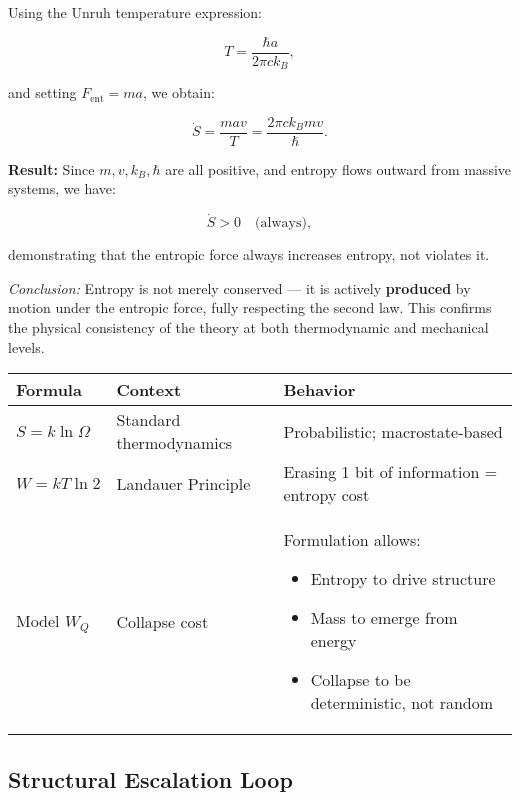 \documentclass[12pt]{article}
\begin{document}
Using the Unruh temperature expression:

\[
T = \frac{\hbar a}{2\pi c k_B},
\]

and setting \( F_{\text{ent}} = m a \), we obtain:

\[
\dot{S} = \frac{m a v}{T} = \frac{2\pi c k_B m v}{\hbar}.
\]

\textbf{Result:} Since \( m, v, k_B, \hbar \) are all positive, and entropy flows outward from massive systems, we have:

\[
\dot{S} > 0 \quad \text{(always)},
\]

demonstrating that the entropic force always increases entropy, not violates it.

\vspace{0.5em}
\textit{Conclusion:} Entropy is not merely conserved — it is actively \textbf{produced} by motion under the entropic force, fully respecting the second law. This confirms the physical consistency of the theory at both thermodynamic and mechanical levels.


\begin{center}
\begin{tabular}{|l|l|p{8cm}|}
\hline
\textbf{Formula} & \textbf{Context} & \textbf{Behavior} \\
\hline
$S = k \ln \Omega$ & Standard thermodynamics & Probabilistic; macrostate-based \\
\hline
$W = kT \ln 2$ & Landauer Principle & Erasing 1 bit of information = entropy cost \\
\hline
Model $W_Q$ & Collapse cost & Formulation allows:
\begin{itemize}
    \item Entropy to drive structure
    \item Mass to emerge from energy
    \item Collapse to be deterministic, not random
\end{itemize} \\
\hline
\end{tabular}
\end{center}



\subsection{Structural Escalation Loop}
\end{document}
